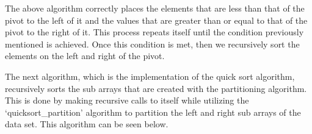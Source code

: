 \documentclass[a4paper,9pt]{article}
\begin{document}
\begin{highlight}
    \noindent The above algorithm correctly places the elements that are less than that of the pivot to the left of it and the values that are greater than or equal to that of the pivot
    to the right of it. This process repeats itself until the condition previously mentioned is achieved. Once this condition is met, then we recursively sort the elements on the left and
    right of the pivot.

\end{highlight}

The next algorithm, which is the implementation of the quick sort algorithm, recursively sorts the sub arrays that are created with the partitioning algorithm. This is done
by making recursive calls to itself while utilizing the `quicksort\_partition' algorithm to partition the left and right sub arrays of the data set. This algorithm can be seen below.
\end{document}
